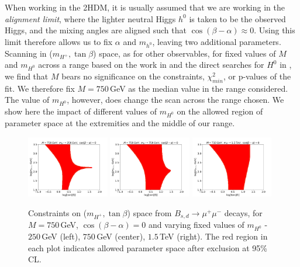 \documentclass[a4paper,12pt]{article}
\begin{document}
When working in the 2HDM, it is usually assumed that we are working in the \emph{alignment limit}, where the lighter neutral Higgs $h^0$ is taken to be the observed Higgs, and the mixing angles are aligned such that $\cos(\beta-\alpha) \approx 0$. 
Using this limit therefore allows us to fix $\alpha$ and $m_{h^0}$, leaving two additional parameters.
Scanning in ($m_{H^+},\tan\beta$) space, as for other observables, for fixed values of $M$ and $m_{H^0}$ across a range based on the work in \cite{trilin} and the direct searches for $H^0$ in \cite{h0search}, we find that $M$ bears no significance on the constraints, $\chi^2_{min}$, or p-values of the fit.
We therefore fix $M=750\,$GeV as the median value in the range considered.
The value of $m_{H^0}$, however, does change the scan across the range chosen. 
We show here the impact of different values of $m_{H^0}$ on the allowed region of parameter space at the extremities and the middle of our range. 
\begin{figure}[ht]
    \centering
    \includegraphics[width=0.32\textwidth]{bmu1.png}
    \includegraphics[width=0.32\textwidth]{bmu2.png}
    \includegraphics[width=0.32\textwidth]{bmu3.png}
    \caption{\label{fig:bmu}Constraints on ($m_{H^+},\tan\beta$) space from $B_{s,d}\to\mu^+\mu^-$ decays, for $M=750\,$GeV, $\cos(\beta-\alpha)=0$ and varying fixed values of $m_{H^0}$ - $250\,$GeV (left), $750\,$GeV (center), $1.5\,$TeV (right).
        The red region in each plot indicates allowed parameter space after exclusion at 95\% CL.}
\end{figure}
\end{document}
